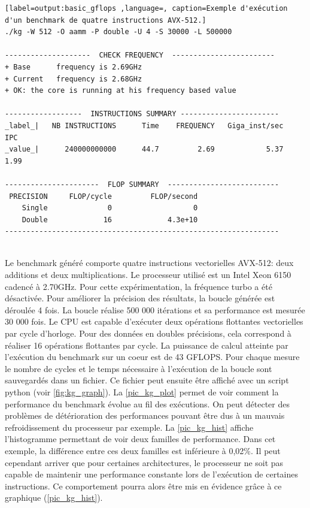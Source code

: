  \begin{minipage}{0.97\linewidth}
 \begin{lstlisting}[label=output:basic_gflops ,language=, caption=Exemple d'exécution d'un benchmark de quatre instructions AVX-512.]
./kg -W 512 -O aamm -P double -U 4 -S 30000 -L 500000

--------------------  CHECK FREQUENCY  ------------------------
+ Base      frequency is 2.69GHz
+ Current   frequency is 2.68GHz
+ OK: the core is running at his frequency based value

------------------  INSTRUCTIONS SUMMARY -----------------------
_label_|   NB INSTRUCTIONS      Time    FREQUENCY   Giga_inst/sec     IPC
_value_|      240000000000      44.7         2.69            5.37    1.99

----------------------  FLOP SUMMARY  --------------------------
 PRECISION     FLOP/cycle         FLOP/second
    Single              0                   0
    Double             16             4.3e+10
----------------------------------------------------------------


\end{lstlisting}   
 \end{minipage}   
        Le benchmark généré comporte quatre instructions vectorielles AVX-512: deux additions et deux multiplications. Le processeur utilisé est un  Intel Xeon 6150 cadencé à 2.70GHz. Pour cette expérimentation, la fréquence turbo a été désactivée. Pour améliorer la précision des résultats, la boucle générée est déroulée 4 fois. La boucle réalise 500 000 itérations et sa performance est mesurée 30 000 fois. Le CPU est capable d'exécuter deux opérations flottantes vectorielles par cycle d'horloge. Pour des données en doubles précisions, cela correspond à réaliser 16 opérations flottantes par cycle. La puissance de calcul atteinte par l'exécution du benchmark sur un coeur est de 43 GFLOPS. Pour chaque mesure le nombre de cycles et le temps nécessaire à l'exécution de la boucle sont sauvegardés dans un fichier. Ce fichier peut ensuite être affiché avec un script python (voir \autoref{fig:kg_graph}). La \autoref{pic_kg_plot} permet de voir comment la performance du benchmark évolue au fil des exécutions. On peut détecter des problèmes de détérioration des performances pouvant être dus à un mauvais refroidissement du processeur par exemple.  La \autoref{pic_kg_hist} affiche l'histogramme permettant de voir deux familles de performance. Dans cet exemple, la différence entre ces deux familles est inférieure à 0,02\%. Il peut cependant arriver que pour certaines architectures, le processeur ne soit pas capable de maintenir une performance constante lors de l'exécution de certaines instructions. Ce comportement pourra alors être mis en évidence grâce à ce graphique (\autoref{pic_kg_hist}).
        
